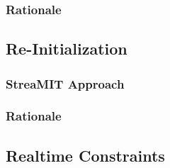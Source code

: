 \subsubsection{Rationale}

\subsection{Re-Initialization}

\subsubsection{StreaMIT Approach}
\subsubsection{Rationale}

\subsection{Realtime Constraints}

